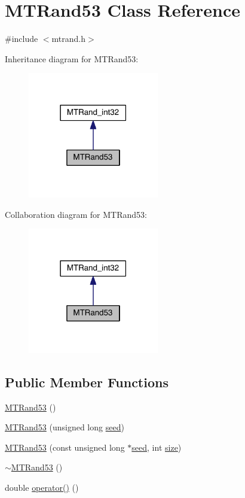 \hypertarget{a00017}{\section{M\-T\-Rand53 Class Reference}
\label{a00017}
}


{\ttfamily \#include $<$mtrand.\-h$>$}



Inheritance diagram for M\-T\-Rand53\-:\nopagebreak
\begin{figure}[H]
\begin{center}
\leavevmode
\includegraphics[width=162pt]{a00154}
\end{center}
\end{figure}


Collaboration diagram for M\-T\-Rand53\-:\nopagebreak
\begin{figure}[H]
\begin{center}
\leavevmode
\includegraphics[width=162pt]{a00155}
\end{center}
\end{figure}
\subsection*{Public Member Functions}
\begin{DoxyCompactItemize}
\item 
\hyperlink{a00017_a24711c9e6e5ee72715f34515d1f1939a}{M\-T\-Rand53} ()
\item 
\hyperlink{a00017_ad800887e15d4095f22facdb67f270c5e}{M\-T\-Rand53} (unsigned long \hyperlink{a00019_a0c57076fe30358e0700a7ce1baa0ea27}{seed})
\item 
\hyperlink{a00017_ac77b190d3ac27adea2d2c6c2ce2347c3}{M\-T\-Rand53} (const unsigned long $\ast$\hyperlink{a00019_a0c57076fe30358e0700a7ce1baa0ea27}{seed}, int \hyperlink{a00062_ae113ea7f9e515a12ac4b5595c6faf61e}{size})
\item 
\hyperlink{a00017_a947a6a7afd0c8a17612cda3faa705a75}{$\sim$\-M\-T\-Rand53} ()
\item 
double \hyperlink{a00017_ab6657cb5349f39bc4553d3a970458b45}{operator()} ()
\end{DoxyCompactItemize}
